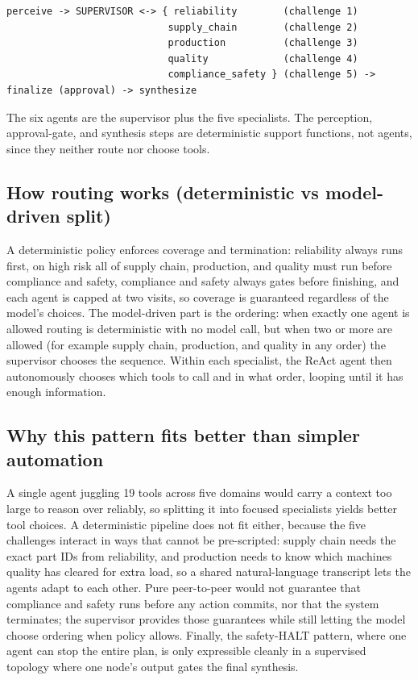 \documentclass[11pt,a4paper]{article}
\let\oldsubsection\subsection
\renewcommand{\subsection}{\needspace{5\baselineskip}\oldsubsection}
\newenvironment{codeblock}{\par\medskip\needspace{4\baselineskip}\noindent\begin{minipage}{\linewidth}}
  {\end{minipage}\par\medskip}
\begin{document}
\begin{codeblock}
\begin{lstlisting}
perceive -> SUPERVISOR <-> { reliability        (challenge 1)
                            supply_chain        (challenge 2)
                            production          (challenge 3)
                            quality             (challenge 4)
                            compliance_safety } (challenge 5) -> finalize (approval) -> synthesize
\end{lstlisting}
\end{codeblock}

The six agents are the supervisor plus the five specialists. The perception, approval-gate, and synthesis steps are deterministic support functions, not agents, since they neither route nor choose tools.

\subsection*{How routing works (deterministic vs model-driven split)}
A deterministic policy enforces coverage and termination: reliability always runs first, on high risk all of supply chain, production, and quality must run before compliance and safety, compliance and safety always gates before finishing, and each agent is capped at two visits, so coverage is guaranteed regardless of the model's choices. The model-driven part is the ordering: when exactly one agent is allowed routing is deterministic with no model call, but when two or more are allowed (for example supply chain, production, and quality in any order) the supervisor chooses the sequence. Within each specialist, the ReAct agent then autonomously chooses which tools to call and in what order, looping until it has enough information.

\subsection*{Why this pattern fits better than simpler automation}
A single agent juggling 19 tools across five domains would carry a context too large to reason over reliably, so splitting it into focused specialists yields better tool choices. A deterministic pipeline does not fit either, because the five challenges interact in ways that cannot be pre-scripted: supply chain needs the exact part IDs from reliability, and production needs to know which machines quality has cleared for extra load, so a shared natural-language transcript lets the agents adapt to each other. Pure peer-to-peer would not guarantee that compliance and safety runs before any action commits, nor that the system terminates; the supervisor provides those guarantees while still letting the model choose ordering when policy allows. Finally, the safety-HALT pattern, where one agent can stop the entire plan, is only expressible cleanly in a supervised topology where one node's output gates the final synthesis.
\end{document}
